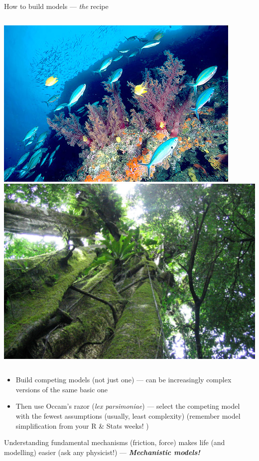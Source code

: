 \documentclass[xcolor={usenames,x11names},compress]{beamer}
\renewcommand{\(}{\begin{columns}}
\renewcommand{\)}{\end{columns}}
\newcommand{\<}[1]{\begin{column}{#1}}
\renewcommand{\>}{\end{column}}
\begin{document}
\begin{frame}{How to build models --- {\it the} recipe}

  \begin{columns}[c]
    \column{2.3in}
    \includegraphics[width=\textwidth]{Reef.jpg}
    \column{2.3in}
    \includegraphics[width=\textwidth]{Forest.jpg}
  \end{columns}

  \begin{itemize} \itemsep4pt
    \item Build competing models (not just one) --- can be 
      increasingly complex versions of the same basic one
      \pause
    \item Then use Occam's razor ({\it lex parsimoniae}) \pause --- 
      select the competing model with the fewest assumptions (usually, 
      least complexity) \pause (remember model simplification from your R \& Stats weeks! )
  \end{itemize}

  \pause
  Understanding fundamental mechanisms (friction, force) makes life (and       
  modelling) easier (ask any physicist!) \pause --- {\it \bf Mechanistic       
  models!}                                                                     

\end{frame}
\end{document}

